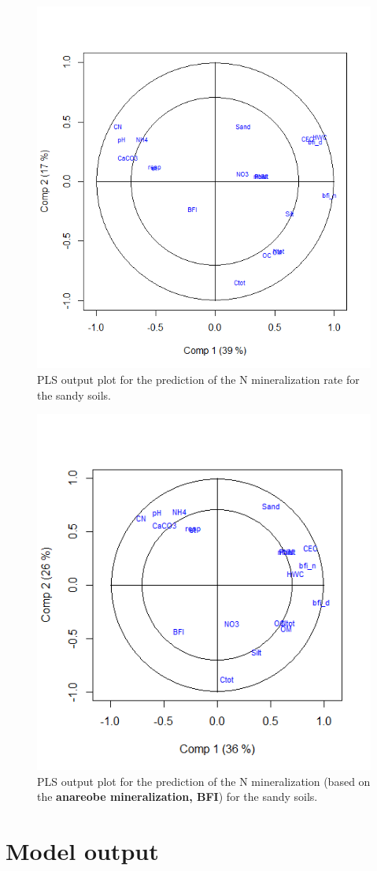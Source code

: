 \documentclass[10pt,twoside,dutch,english]{report}
\begin{document}
\begin{appendices}
\begin{figure}[H]
		\centering
		\includegraphics[width=0.6\linewidth]{app_pls_san}
		\caption{PLS output plot for the prediction of the N mineralization rate for the sandy soils.}
		\end{figure}

     \begin{figure}[H] %
		
		\centering
		\includegraphics[width=0.6\linewidth]{app_pls_bfi_san}
		\caption{PLS output plot for the prediction of the N mineralization (based on the \textbf{anareobe mineralization, BFI}) for the sandy soils.}
        \label{fig: PLSbfi}
		\end{figure}

\chapter{Model output}
\label{chap:Model output}


\end{appendices}
\end{document}
